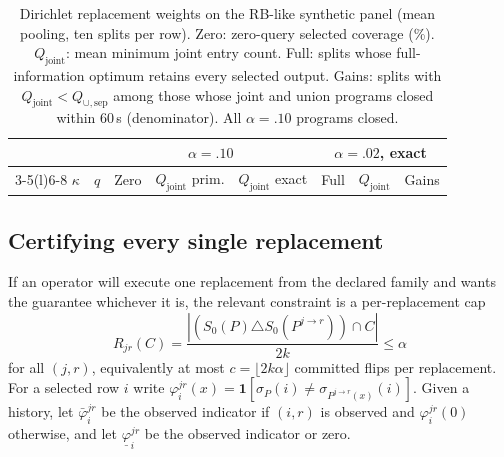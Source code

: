 \documentclass[11pt]{article}
\newcommand{\Qj}{Q_{\mathrm{joint}}}
\newcommand{\Qu}{Q_{\cup,\mathrm{sep}}}
\newcommand{\Sz}{S_0}
\newcommand{\ind}{\mathbf{1}}
\begin{document}
\begin{table}[t]
\centering\footnotesize
\setlength{\tabcolsep}{1.6pt}
\begin{tabular}{@{}lr rrr rrr@{}}
\toprule
& & \multicolumn{3}{c}{$\alpha=.10$} & \multicolumn{3}{c}{$\alpha=.02$, exact}\\
\cmidrule(lr){3-5}\cmidrule(l){6-8}
$\kappa$ & $q$ & Zero & $\Qj$ prim. & $\Qj$ exact & Full & $\Qj$ & Gains\\
\midrule
\bottomrule
\end{tabular}
\caption{Dirichlet replacement weights on the RB-like synthetic panel (mean pooling, ten splits per row). Zero: zero-query selected coverage (\%). $\Qj$: mean minimum joint entry count. Full: splits whose full-information optimum retains every selected output. Gains: splits with $\Qj<\Qu$ among those whose joint and union programs closed within 60\,s (denominator). All $\alpha=.10$ programs closed.}
\label{tab:dirichlet}
\end{table}

\subsection{Certifying every single replacement}
\label{app:caps}
If an operator will execute one replacement from the declared family and wants the guarantee whichever it is, the relevant constraint is a per-replacement cap
\[
R_{jr}(C)=\frac{|(\Sz(P)\triangle\Sz(P^{j\to r}))\cap C|}{2k}\le\alpha
\]
for all $(j,r)$,
equivalently at most $c=\lfloor 2k\alpha\rfloor$ committed flips per replacement. For a selected row $i$ write $\varphi_i^{jr}(x)=\ind[\sigma_P(i)\neq\sigma_{P^{j\to r}(x)}(i)]$. Given a history, let $\bar\varphi_i^{jr}$ be the observed indicator if $(i,r)$ is observed and $\varphi_i^{jr}(0)$ otherwise, and let $\underline\varphi_i^{jr}$ be the observed indicator or zero.
\end{document}
